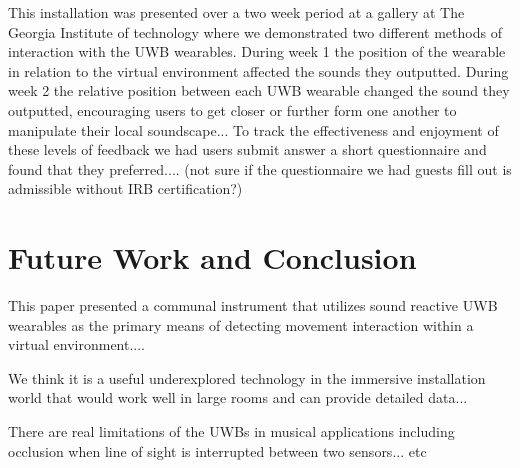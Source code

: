 \documentclass[sigconf]{nimeart}
\begin{document}
This installation was presented over a two week period at a gallery at The Georgia Institute of technology where we demonstrated two different methods of interaction with the UWB wearables.  During week 1 the position of the wearable in relation to the virtual environment affected the sounds they outputted. During week 2 the relative position between each UWB wearable changed the sound they outputted, encouraging users to get closer or further form one another to manipulate their local soundscape... To track the effectiveness and enjoyment of these levels of feedback we had users submit answer a short questionnaire and found that they preferred.... (not sure if the questionnaire we had guests fill out is admissible without IRB certification?) 

\section{Future Work and Conclusion}

This paper presented a communal instrument that utilizes sound reactive UWB wearables as the primary means of detecting movement interaction within a virtual environment.... 

We think it is a useful underexplored technology in the immersive installation world that would work well in large rooms and can provide detailed data...

There are real limitations of the UWBs in musical applications including occlusion when line of sight is interrupted between two sensors... etc

\nocite{*}




\end{document}
